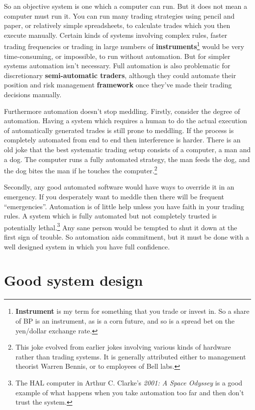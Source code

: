 So an objective system is one which a computer can run. But it does not mean a computer must run it. You can run many trading strategies using pencil and paper, or relatively simple spreadsheets, to calculate trades which you then execute manually. Certain kinds of systems involving complex rules, faster trading frequencies or trading in large numbers of \textbf{instruments}\footnote{\textbf{Instrument} is my term for something that you trade or invest in. So a share of BP is an instrument, as is a corn future, and so is a spread bet on the yen/dollar exchange rate.} would be very time-consuming, or impossible, to run without automation. But for simpler systems automation isn't necessary. Full automation is also problematic for discretionary \textbf{semi-automatic traders}, although they could automate their position and risk management \textbf{framework} once they've made their trading decisions manually.

Furthermore automation doesn't stop meddling. Firstly, consider the degree of automation. Having a system which requires a human to do the actual execution of automatically generated trades is still prone to meddling. If the process is completely automated from end to end then interference is harder. There is an old joke that the best systematic trading setup consists of a computer, a man and a dog. The computer runs a fully automated strategy, the man feeds the dog, and the dog bites the man if he touches the computer.\footnote{This joke evolved from earlier jokes involving various kinds of hardware rather than trading systems. It is generally attributed either to management theorist Warren Bennis, or to employees of Bell labs.}

Secondly, any good automated software would have ways to override it in an emergency. If you desperately want to meddle then there will be frequent ``emergencies''. Automation is of little help unless you have faith in your trading rules. A system which is fully automated but not completely trusted is potentially lethal.\footnote{The HAL computer in Arthur C. Clarke's \textit{2001: A Space Odyssey} is a good example of what happens when you take automation too far and then don't trust the system.} Any sane person would be tempted to shut it down at the first sign of trouble. So automation aids commitment, but it must be done with a well designed system in which you have full confidence.

\section*{Good system design}  {}

